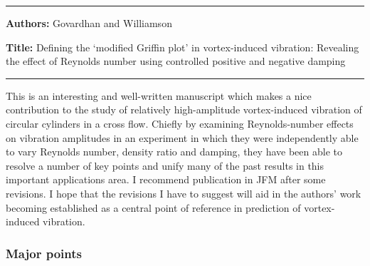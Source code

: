 \documentclass[a4paper,11pt]{article}
\begin{document}
\begin{center}
\noindent
\rule{\textwidth}{0.25mm}
\end{center}

\noindent
\textbf{Authors:}
Govardhan and Williamson

\noindent
\textbf{Title:}
Defining the `modified Griffin plot' in vortex-induced vibration:
Revealing the effect of Reynolds number using controlled positive
and negative damping

\begin{center}
\noindent
\rule{\textwidth}{0.25mm}
\end{center}

This is an interesting and well-written manuscript which makes a nice
contribution to the study of relatively high-amplitude vortex-induced
vibration of circular cylinders in a cross flow. Chiefly by examining
Reynolds-number effects on vibration amplitudes in an experiment in
which they were independently able to vary Reynolds number, density
ratio and damping, they have been able to resolve a number of key
points and unify many of the past results in this important
applications area. I recommend publication in JFM after some
revisions. I hope that the revisions I have to suggest will aid in the
authors' work becoming established as a central point of reference in
prediction of vortex-induced vibration.

\subsubsection*{Major points}
\end{document}
